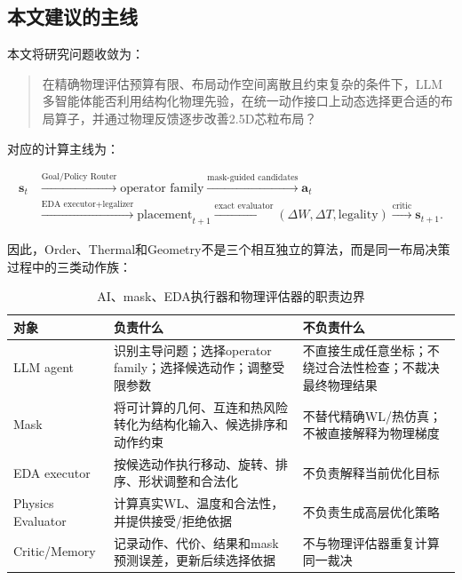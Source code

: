 \documentclass[UTF8,a4paper,12pt]{ctexart}
\newcommand{\state}{\boldsymbol{s}}
\newcommand{\action}{\boldsymbol{a}}
\begin{document}
\subsection{本文建议的主线}

本文将研究问题收敛为：

\begin{quote}
在精确物理评估预算有限、布局动作空间离散且约束复杂的条件下，LLM多智能体能否利用结构化物理先验，在统一动作接口上动态选择更合适的布局算子，并通过物理反馈逐步改善2.5D芯粒布局？
\end{quote}

对应的计算主线为：

\begin{equation}
\begin{aligned}
\state_t &\xrightarrow{\text{Goal/Policy Router}} \text{operator family}
\xrightarrow{\text{mask-guided candidates}} \action_t \\
&\xrightarrow{\text{EDA executor+legalizer}} \text{placement}_{t+1}
\xrightarrow{\text{exact evaluator}} (\Delta W,\Delta T,\text{legality})
\xrightarrow{\text{critic}} \state_{t+1}.
\end{aligned}
\end{equation}

因此，Order、Thermal和Geometry不是三个相互独立的算法，而是同一布局决策过程中的三类动作族：

\begin{table}[htbp]
\centering
\caption{AI、mask、EDA执行器和物理评估器的职责边界}
\begin{tabularx}{\textwidth}{>{\raggedright\arraybackslash}p{2.6cm}X X}
\toprule
对象 & 负责什么 & 不负责什么 \\
\midrule
LLM agent & 识别主导问题；选择operator family；选择候选动作；调整受限参数 & 不直接生成任意坐标；不绕过合法性检查；不裁决最终物理结果 \\
Mask & 将可计算的几何、互连和热风险转化为结构化输入、候选排序和动作约束 & 不替代精确WL/热仿真；不被直接解释为物理梯度 \\
EDA executor & 按候选动作执行移动、旋转、排序、形状调整和合法化 & 不负责解释当前优化目标 \\
Physics Evaluator & 计算真实WL、温度和合法性，并提供接受/拒绝依据 & 不负责生成高层优化策略 \\
Critic/Memory & 记录动作、代价、结果和mask预测误差，更新后续选择依据 & 不与物理评估器重复计算同一裁决 \\
\bottomrule
\end{tabularx}
\end{table}
\end{document}
